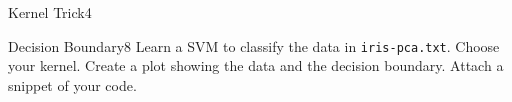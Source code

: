 \begin{questions}
\begin{question}{Kernel Trick}{4}
\begin{answer}\end{answer}
\end{question}


\begin{question}{Decision Boundary}{8}
Learn a SVM to classify the data in \texttt{iris-pca.txt}. Choose your kernel. Create a plot showing the data and the decision boundary. Attach a snippet of your code.

\begin{answer}\end{answer}

\end{question}

\end{questions}
